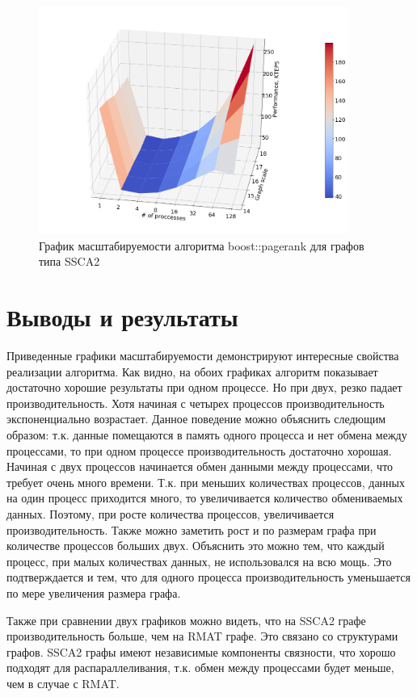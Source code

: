 \documentclass[12pt, a4paper]{article}
\begin{document}
        \begin{figure}[h!]
            \centering
            \includegraphics[width=0.9\textwidth]{pics/SSCA2}
            \caption{График масштабируемости алгоритма boost::pagerank для графов типа SSCA2}
            \label{fig:ssca2}
        \end{figure}

    \section{Выводы и результаты}
        Приведенные графики масштабируемости демонстрируют интересные свойства реализации алгоритма. Как видно, на обоих графиках алгоритм показывает достаточно хорошие результаты при одном процессе. Но при двух, резко падает производительность. Хотя начиная с четырех процессов производительность экспоненциально возрастает. Данное поведение можно объяснить следющим образом: т.к. данные помещаются в память одного процесса и нет обмена между процессами, то при одном процессе производительность достаточно хорошая. Начиная с двух процессов начинается обмен данными между процессами, что требует очень много времени. Т.к. при меньших количествах процессов, данных на один процесс приходится много, то увеличивается количество обмениваемых данных. Поэтому, при росте количества процессов, увеличивается производительность. Также можно заметить рост и по размерам графа при количестве процессов больших двух. Объяснить это можно тем, что каждый процесс, при малых количествах данных, не использовался на всю мощь. Это подтверждается и тем, что для одного процесса производительность уменьшается по мере увеличения размера графа.

        Также при сравнении двух графиков можно видеть, что на SSCA2 графе производительность больше, чем на RMAT графе. Это связано со структурами графов. SSCA2 графы имеют независимые компоненты связности, что хорошо подходят для распараллеливания, т.к. обмен между процессами будет меньше, чем в случае с RMAT.
\end{document}
